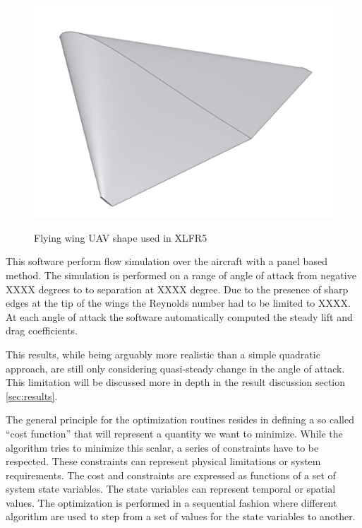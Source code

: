 \begin{figure}[ht]
	\begin{center}
	\scalebox{0.5}            %
 	{\includegraphics{./Figures/UAV.png}}
	\end{center}
	\caption{Flying wing UAV shape used in XLFR5}
	\label{fig:UAV}
\end{figure}

\par This software perform flow simulation over the aircraft with a panel based method. 
The simulation is performed on a range of angle of attack from negative XXXX degrees to to separation at XXXX degree.
Due to the presence of sharp edges at the tip of the wings the Reynolds number had to be limited to XXXX.
At each angle of attack the software automatically computed the steady lift and drag coefficients.

\par [GRAPH OF CL AND CD VS ALPHA !!!]

\par This results, while being arguably more realistic than a simple quadratic approach, are still only considering quasi-steady change in the angle of attack.
This limitation will be discussed more in depth in the result discussion section \ref{sec:results}.




\par The general principle for the optimization routines resides in defining a so called ``cost function'' that will represent a quantity we want to minimize.
While the algorithm tries to minimize this scalar, a series of constraints have to be respected. 
These constraints can represent physical limitations or system requirements.
The cost and constraints are expressed as functions of a set of system state variables.
The state variables can represent temporal or spatial values.
The optimization is performed in a sequential fashion where different algorithm are used to step from a set of values for the state variables to another. 

